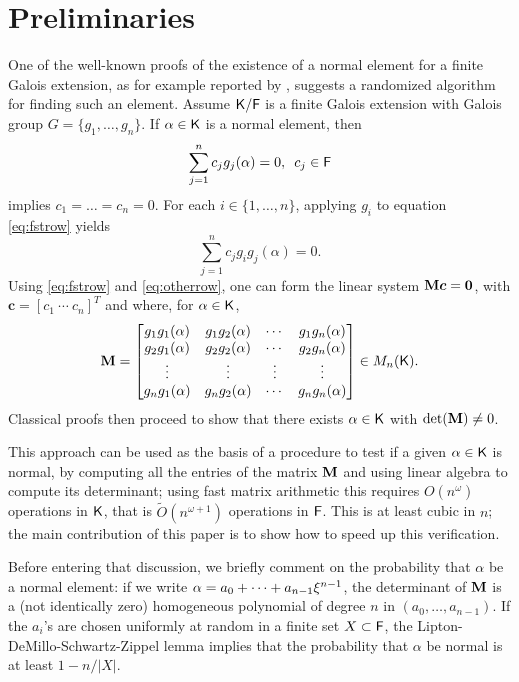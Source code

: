 \section{Preliminaries}
\label{sec:pre}

One of the well-known proofs of the existence of a normal element for a
finite Galois extension, as for example reported by \citet[Theorem 6.13.1]{Lang}, suggests a randomized
algorithm for finding such an element. Assume ${\mathsf{K}}/{\mathsf{F}}$ is a finite Galois
extension with Galois group $G = \lbrace g_1 , \ldots , g_n \rbrace$. If
$\alpha \in {\mathsf{K}}$ is a normal element, then
\begin{equation}
  \label{eq:fstrow}
  \sum_{j=1}^n 
  c_j g_j(\alpha)=0, \,\,\, c_j \in {\mathsf{F}} 
\end{equation} 
implies $c_1 =\dots=c_n = 0$. For each
$i \in \lbrace 1, \ldots , n\rbrace$, applying $g_i$ to equation
\eqref{eq:fstrow} yields
\begin{equation} \label{eq:otherrow} \sum_{j=1}^n c_j g_i g_j(\alpha)=0.
\end{equation}
Using \eqref{eq:fstrow} and \eqref{eq:otherrow}, one can form the linear
system $\mat{M}\boldsymbol{c} = \textbf{0}$,
with $\boldsymbol{c} = [ c_1~ \cdots~c_n]^T$ and
where, for $\alpha\in{\mathsf{K}}$,
\begin{equation}\label{eqdef:M}
  \mat M =
  \begin{bmatrix}
    g_1 g_1(\alpha) & g_1 g_2(\alpha) & \cdots & g_1 g_n(\alpha) \\
    g_2 g_1(\alpha) & g_2 g_2(\alpha) & \cdots & g_2 g_n(\alpha) \\
    \vdots		& \vdots	& \vdots & \vdots \\
    g_n g_1(\alpha) & g_n g_2(\alpha) & \cdots & g_n g_n(\alpha) \\
  \end{bmatrix} \in M_n(\K).
\end{equation}
Classical proofs then proceed to show that there exists $\alpha \in {\mathsf{K}}$
with $\det(\mat M)\neq 0$.
 
This approach can be used as the basis of a procedure to test if a
given $\alpha\in{\mathsf{K}}$ is normal, by computing all the entries of the
matrix $\mat M$ and using linear algebra to compute its determinant;
using fast matrix arithmetic this requires $O(n^\omega)$ operations in
${\mathsf{K}}$, that is $\tilde{O}(n^{\omega+1})$ operations in ${\mathsf{F}}$. This is at
least cubic in $n$; the main contribution of this paper is to show how
to speed up this verification.
 
Before entering that discussion, we briefly comment on the probability
that $\alpha$ be a normal element: if we write $\alpha = a_0 + \cdots
+ a_{n-1} \xi^{n-1}$, the determinant of $\mat M$ is a
(not identically zero) homogeneous polynomial of degree $n$ in
$(a_0,\dots,a_{n-1})$. If the $a_i$'s are chosen uniformly at random
in a finite set $X \subset {\mathsf{F}}$, the Lipton-DeMillo-Schwartz-Zippel lemma
implies that the probability that $\alpha$ be normal is at least
$1-n/|X|$.


